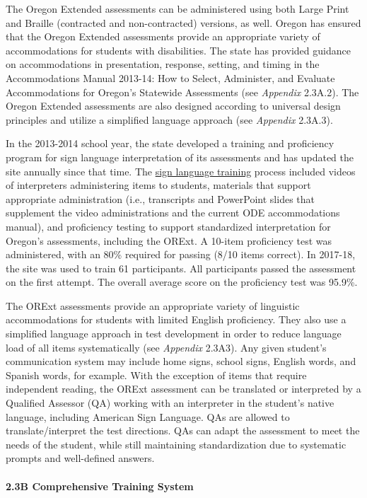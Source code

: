 \documentclass[]{article}
\let\oldparagraph\paragraph
\renewcommand{\paragraph}[1]{\oldparagraph{#1}\mbox{}}
\begin{document}
The Oregon Extended assessments can be administered using both Large
Print and Braille (contracted and non-contracted) versions, as well.
Oregon has ensured that the Oregon Extended assessments provide an
appropriate variety of accommodations for students with disabilities.
The state has provided guidance on accommodations in presentation,
response, setting, and timing in the Accommodations Manual 2013-14: How
to Select, Administer, and Evaluate Accommodations for Oregon's
Statewide Assessments (see \emph{Appendix} 2.3A.2). The Oregon Extended
assessments are also designed according to universal design principles
and utilize a simplified language approach (see \emph{Appendix} 2.3A.3).

In the 2013-2014 school year, the state developed a training and
proficiency program for sign language interpretation of its assessments
and has updated the site annually since that time. The
\color{link}\href{http://lms.brtprojects.org}{sign language training}
\color{black} process included videos of interpreters administering
items to students, materials that support appropriate administration
(i.e., transcripts and PowerPoint slides that supplement the video
administrations and the current ODE accommodations manual), and
proficiency testing to support standardized interpretation for Oregon's
assessments, including the ORExt. A 10-item proficiency test was
administered, with an 80\% required for passing (8/10 items correct). In
2017-18, the site was used to train 61 participants. All participants
passed the assessment on the first attempt. The overall average score on
the proficiency test was 95.9\%.

The ORExt assessments provide an appropriate variety of linguistic
accommodations for students with limited English proficiency. They also
use a simplified language approach in test development in order to
reduce language load of all items systematically (see \emph{Appendix}
2.3A3). Any given student's communication system may include home signs,
school signs, English words, and Spanish words, for example. With the
exception of items that require independent reading, the ORExt
assessment can be translated or interpreted by a Qualified Assessor (QA)
working with an interpreter in the student's native language, including
American Sign Language. QAs are allowed to translate/interpret the test
directions. QAs can adapt the assessment to meet the needs of the
student, while still maintaining standardization due to systematic
prompts and well-defined answers.

\hypertarget{b-comprehensive-training-system}{%
\paragraph{2.3B Comprehensive Training
System}\label{b-comprehensive-training-system}}
\end{document}
